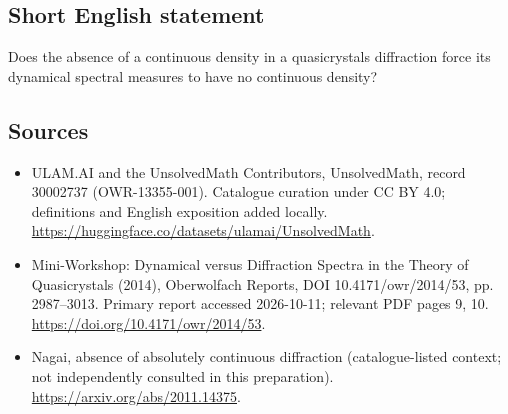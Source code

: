 \documentclass[11pt]{article}
\begin{document}
\subsection{Short English statement}
Does the absence of a continuous density in a quasicrystal\textquotesingle s diffraction force its dynamical spectral measures to have no continuous density?
\subsection{Sources}
\begin{itemize}
\item[\hypertarget{source:30002737:1}{S1}] ULAM.AI and the UnsolvedMath Contributors, UnsolvedMath, record 30002737 (OWR-13355-001). Catalogue curation under CC BY 4.0; definitions and English exposition added locally.
\url{https://huggingface.co/datasets/ulamai/UnsolvedMath}.
\item[\hypertarget{source:30002737:2}{S2}] Mini-Workshop: Dynamical versus Diffraction Spectra in the Theory of Quasicrystals (2014), Oberwolfach Reports, DOI 10.4171/owr/2014/53, pp. 2987--3013. Primary report accessed 2026-10-11; relevant PDF pages 9, 10.
\url{https://doi.org/10.4171/owr/2014/53}.
\item[\hypertarget{source:30002737:3}{S3}] Nagai, absence of absolutely continuous diffraction (catalogue-listed context; not independently consulted in this preparation).
\url{https://arxiv.org/abs/2011.14375}.
\end{itemize}
\label{end:30002737}
\end{document}
